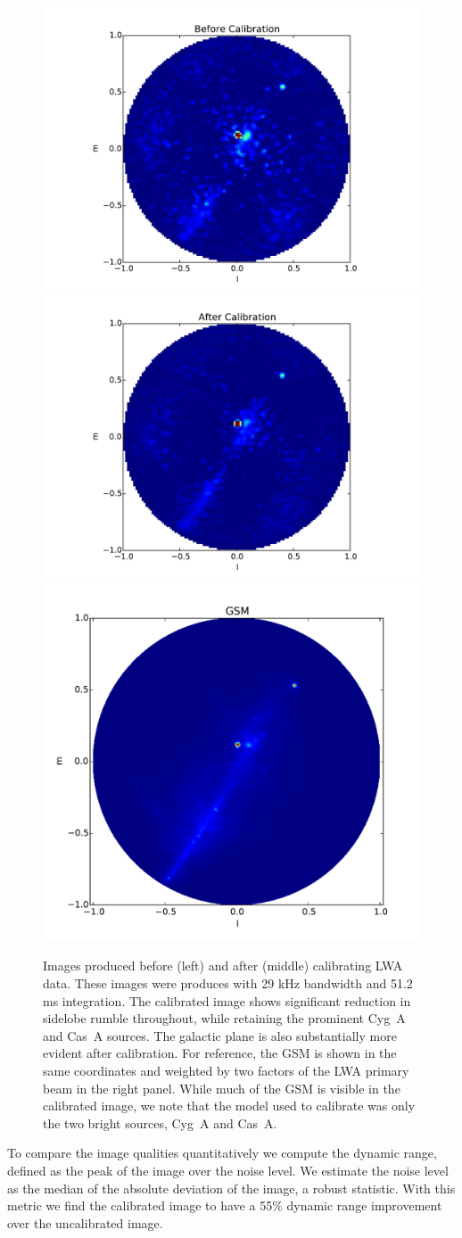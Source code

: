 \documentclass[a4paper,fleqn,usenatbib]{mnras}
\begin{document}
\begin{figure}
\begin{center}
\includegraphics[width=0.3\linewidth]{cal_paper_data_image_before.pdf}
\includegraphics[width=0.3\linewidth]{cal_paper_data_image_after.pdf}
\includegraphics[width=0.3\linewidth]{cal_paper_gsm_beam_weighted.pdf}
\caption{Images produced before (left) and after (middle) calibrating LWA data. These images were produces with 29 kHz bandwidth and 51.2 ms integration. The calibrated image shows significant reduction in sidelobe rumble throughout, while retaining the prominent Cyg~A and Cas~A sources. The galactic plane is also substantially more evident after calibration. For reference, the GSM is shown in the same coordinates and weighted by two factors of the LWA primary beam in the right panel. While much of the GSM is visible in the calibrated image, we note that the model used to calibrate was only the two bright sources, Cyg~A and Cas~A.
}
\label{fig:data_images}
\end{center}
\end{figure}

To compare the image qualities quantitatively we compute the dynamic range, defined as the peak of the image over the noise level. We estimate the noise level as the median of the absolute deviation of the image, a robust statistic. With this metric we find the calibrated image to have a 55\% dynamic range improvement over the uncalibrated image.
\end{document}
